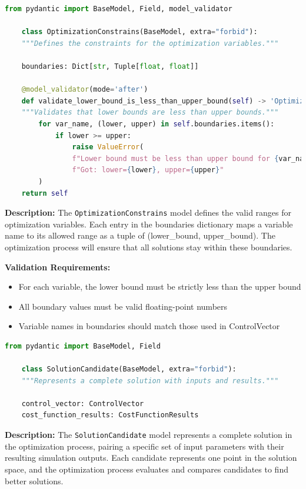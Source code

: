 \begin{lstlisting}[language=Python, caption={OptimizationConstrains model with validation logic}]
	from pydantic import BaseModel, Field, model_validator
	
	class OptimizationConstrains(BaseModel, extra="forbid"):
	"""Defines the constraints for the optimization variables."""
	
	boundaries: Dict[str, Tuple[float, float]]
	
	@model_validator(mode='after')
	def validate_lower_bound_is_less_than_upper_bound(self) -> 'OptimizationConstrains':
	"""Validates that lower bounds are less than upper bounds."""
		for var_name, (lower, upper) in self.boundaries.items():
			if lower >= upper:
				raise ValueError(
				f"Lower bound must be less than upper bound for {var_name}. "
				f"Got: lower={lower}, upper={upper}"
		)
	return self
\end{lstlisting}


\textbf{Description:}
The \texttt{OptimizationConstrains} model defines the valid ranges for optimization variables. Each entry in the boundaries dictionary maps a variable name to its allowed range as a tuple of (lower\_bound, upper\_bound). The optimization process will ensure that all solutions stay within these boundaries.

\textbf{Validation Requirements:}
\begin{itemize}
	\item For each variable, the lower bound must be strictly less than the upper bound
	\item All boundary values must be valid floating-point numbers
	\item Variable names in boundaries should match those used in ControlVector
\end{itemize}

\begin{lstlisting}[language=Python, caption={SolutionCandidate model definition}]
	from pydantic import BaseModel, Field
	
	class SolutionCandidate(BaseModel, extra="forbid"):
	"""Represents a complete solution with inputs and results."""
	
	control_vector: ControlVector
	cost_function_results: CostFunctionResults
\end{lstlisting}

\textbf{Description:}
The \texttt{SolutionCandidate} model represents a complete solution in the optimization process, pairing a specific set of input parameters with their resulting simulation outputs. Each candidate represents one point in the solution space, and the optimization process evaluates and compares candidates to find better solutions.

